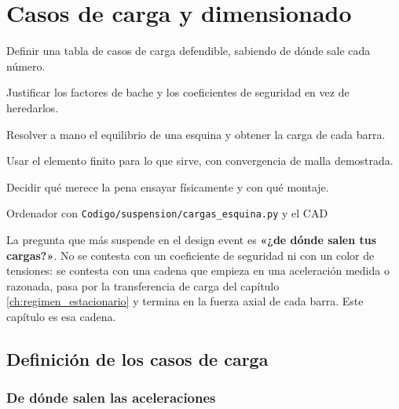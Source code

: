 \chapter{Casos de carga y dimensionado}
\label{ch:casos_carga}

\begin{objetivos}
  \item Definir una tabla de casos de carga defendible, sabiendo de dónde sale
        cada número.
  \item Justificar los factores de bache y los coeficientes de seguridad en vez
        de heredarlos.
  \item Resolver a mano el equilibrio de una esquina y obtener la carga de cada
        barra.
  \item Usar el elemento finito para lo que sirve, con convergencia de malla
        demostrada.
  \item Decidir qué merece la pena ensayar físicamente y con qué montaje.
\end{objetivos}

%
{Ordenador con \texttt{Codigo/suspension/cargas\_esquina.py} y el CAD}

\begin{clave}
La pregunta que más suspende en el design event es \textbf{«¿de dónde salen tus
cargas?»}. No se contesta con un coeficiente de seguridad ni con un color de
tensiones: se contesta con una cadena que empieza en una aceleración medida o
razonada, pasa por la transferencia de carga del capítulo
\ref{ch:regimen_estacionario} y termina en la fuerza axial de cada barra. Este
capítulo es esa cadena.
\end{clave}

\section{Definición de los casos de carga}
\label{sec:casos_carga:01}

\subsection{De dónde salen las aceleraciones}

